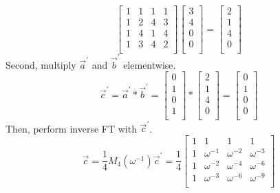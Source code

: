 \documentclass[11pt]{article}
\newenvironment{qparts}{\begin{enumerate}[{(}a{)}]}{\end{enumerate}}
\begin{document}
\begin{qparts}
\[		\begin{bmatrix} 
			1 & 1 & 1 & 1 \\ 
			1 & 2 & 4 & 3 \\ 
			1 & 4 & 1 & 4 \\ 
			1 & 3 & 4 & 2 \\ 
		\end{bmatrix}		
		\begin{bmatrix} 
			3 \\ 
			4 \\ 
			0 \\ 
			0 \\ 
		\end{bmatrix}
		=
		\begin{bmatrix} 
			2 \\ 
			1 \\ 
			4 \\ 
			0 \\ 
		\end{bmatrix}
	\]
	Second, multiply $\vec a^\prime$ and $\vec b^\prime$ elementwise.
	\[
		\vec c^\prime = \vec a^\prime * \vec b^\prime = 
		\begin{bmatrix} 
			0 \\ 
			1 \\ 
			0 \\ 
			1 \\ 
		\end{bmatrix}
		*
		\begin{bmatrix} 
			2 \\ 
			1 \\ 
			4 \\ 
			0 \\ 
		\end{bmatrix}
		=
		\begin{bmatrix} 
			0 \\ 
			1 \\ 
			0 \\ 
			0 \\ 
		\end{bmatrix}
	\]
	Then, perform inverse FT with $\vec c^\prime$.
	\[
		\vec c = \frac{1}{4}M_4(\omega^{-1})\vec c^\prime
		= 
		\frac{1}{4}
		\begin{bmatrix} 
			1 & 1 & 1 & 1 \\ 
			1 & \omega^{-1} & \omega^{-2} & \omega^{-3} \\ 
			1 & \omega^{-2} & \omega^{-4} & \omega^{-6} \\ 
			1 & \omega^{-3} & \omega^{-6} & \omega^{-9} \\ 
		\end{bmatrix}
\]
\end{qparts}
\end{document}
